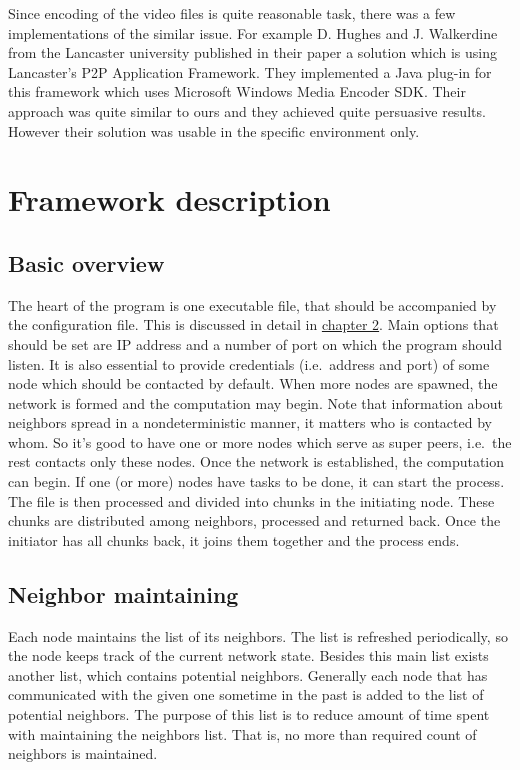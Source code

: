 Since encoding of the video files is quite reasonable task, there was a
few implementations of the similar issue. For example D. Hughes and J.
Walkerdine from the Lancaster university published in their paper a
solution which is using Lancaster's P2P Application Framework. They
implemented a Java plug-in for this framework which uses Microsoft
Windows Media Encoder SDK. Their approach was quite similar to ours and
they achieved quite persuasive results. However their solution was
usable in the specific environment only.

\section{Framework description}\label{framework-description}

\subsection{Basic overview}\label{basic-overview}

The heart of the program is one executable file, that should be
accompanied by the configuration file. This is discussed in detail in
\hyperref[installation-and-use]{chapter 2}. Main options that should be
set are IP address and a number of port on which the program should
listen. It is also essential to provide credentials (i.e.~address and
port) of some node which should be contacted by default. When more nodes
are spawned, the network is formed and the computation may begin. Note
that information about neighbors spread in a nondeterministic manner, it
matters who is contacted by whom. So it's good to have one or more nodes
which serve as super peers, i.e.~the rest contacts only these nodes.
Once the network is established, the computation can begin. If one (or
more) nodes have tasks to be done, it can start the process. The file is
then processed and divided into chunks in the initiating node. These
chunks are distributed among neighbors, processed and returned back.
Once the initiator has all chunks back, it joins them together and the
process ends.

\subsection{Neighbor maintaining}\label{neighbor-maintaining}

Each node maintains the list of its neighbors. The list is refreshed
periodically, so the node keeps track of the current network state.
Besides this main list exists another list, which contains potential
neighbors. Generally each node that has communicated with the given one
sometime in the past is added to the list of potential neighbors. The
purpose of this list is to reduce amount of time spent with maintaining
the neighbors list. That is, no more than required count of neighbors is
maintained.

